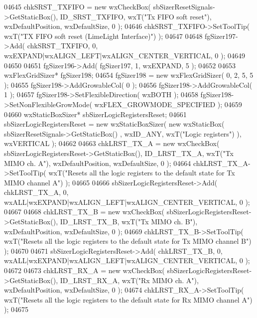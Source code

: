 \begin{DoxyCode}
04645     chkSRST_TXFIFO = \textcolor{keyword}{new} wxCheckBox( sbSizerResetSignals->GetStaticBox(), 
      ID_SRST_TXFIFO, wxT(\textcolor{stringliteral}{"Tx FIFO soft reset"}), wxDefaultPosition, wxDefaultSize, 0 );
04646     chkSRST_TXFIFO->SetToolTip( wxT(\textcolor{stringliteral}{"TX FIFO soft reset (LimeLight Interface)"}) );
04647     
04648     fgSizer197->Add( chkSRST_TXFIFO, 0, wxEXPAND|wxALIGN\_LEFT|wxALIGN\_CENTER\_VERTICAL, 0 );
04649     
04650     
04651     fgSizer196->Add( fgSizer197, 1, wxEXPAND, 5 );
04652     
04653     wxFlexGridSizer* fgSizer198;
04654     fgSizer198 = \textcolor{keyword}{new} wxFlexGridSizer( 0, 2, 5, 5 );
04655     fgSizer198->AddGrowableCol( 0 );
04656     fgSizer198->AddGrowableCol( 1 );
04657     fgSizer198->SetFlexibleDirection( wxBOTH );
04658     fgSizer198->SetNonFlexibleGrowMode( wxFLEX\_GROWMODE\_SPECIFIED );
04659     
04660     wxStaticBoxSizer* sbSizerLogicRegistersReset;
04661     sbSizerLogicRegistersReset = \textcolor{keyword}{new} wxStaticBoxSizer( \textcolor{keyword}{new} wxStaticBox( sbSizerResetSignals->GetStaticBox()
      , wxID\_ANY, wxT(\textcolor{stringliteral}{"Logic registers"}) ), wxVERTICAL );
04662     
04663     chkLRST_TX_A = \textcolor{keyword}{new} wxCheckBox( sbSizerLogicRegistersReset->GetStaticBox(), 
      ID_LRST_TX_A, wxT(\textcolor{stringliteral}{"Tx MIMO ch. A"}), wxDefaultPosition, wxDefaultSize, 0 );
04664     chkLRST_TX_A->SetToolTip( wxT(\textcolor{stringliteral}{"Resets all the logic registers to the default state for Tx MIMO channel
       A"}) );
04665     
04666     sbSizerLogicRegistersReset->Add( chkLRST_TX_A, 0, wxALL|wxEXPAND|wxALIGN\_LEFT|wxALIGN\_CENTER\_VERTICAL, 
      0 );
04667     
04668     chkLRST_TX_B = \textcolor{keyword}{new} wxCheckBox( sbSizerLogicRegistersReset->GetStaticBox(), 
      ID_LRST_TX_B, wxT(\textcolor{stringliteral}{"Tx MIMO ch. B"}), wxDefaultPosition, wxDefaultSize, 0 );
04669     chkLRST_TX_B->SetToolTip( wxT(\textcolor{stringliteral}{"Resets all the logic registers to the default state for Tx MIMO channel
       B"}) );
04670     
04671     sbSizerLogicRegistersReset->Add( chkLRST_TX_B, 0, wxALL|wxEXPAND|wxALIGN\_LEFT|wxALIGN\_CENTER\_VERTICAL, 
      0 );
04672     
04673     chkLRST_RX_A = \textcolor{keyword}{new} wxCheckBox( sbSizerLogicRegistersReset->GetStaticBox(), 
      ID_LRST_RX_A, wxT(\textcolor{stringliteral}{"Rx MIMO ch. A"}), wxDefaultPosition, wxDefaultSize, 0 );
04674     chkLRST_RX_A->SetToolTip( wxT(\textcolor{stringliteral}{"Resets all the logic registers to the default state for Rx MIMO channel
       A"}) );
04675     

\end{DoxyCode}
